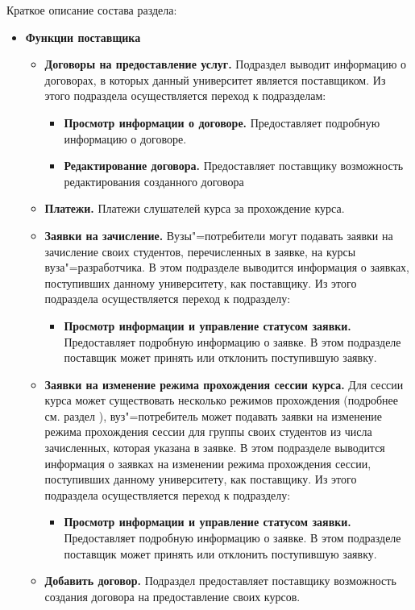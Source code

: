 Краткое описание состава раздела:
\begin{itemize}
	\item \textbf{Функции поставщика}
	\begin{itemize}
		\item \textbf{Договоры на предоставление услуг.} Подраздел выводит информацию о договорах, в которых данный университет является поставщиком. Из этого подраздела осуществляется переход к подразделам:
		\begin{itemize}
			\item \textbf{Просмотр информации о договоре.} Предоставляет подробную информацию о договоре.
			\item \textbf{Редактирование договора.} Предоставляет поставщику возможность редактирования созданного договора
		\end{itemize}
		\item \textbf{Платежи.} Платежи слушателей курса за прохождение курса.
		\item \textbf{Заявки на зачисление.} Вузы"=потребители могут подавать заявки на зачисление своих студентов, перечисленных в заявке, на курсы вуза"=разработчика. В этом подразделе выводится информация о заявках, поступивших данному университету, как поставщику.  Из этого подраздела осуществляется переход к подразделу:
		\begin{itemize}
			\item \textbf{Просмотр информации и управление статусом заявки.} Предоставляет подробную информацию о заявке. В этом подразделе поставщик может принять или отклонить поступившую заявку.
		\end{itemize}
		\item \textbf{Заявки на изменение режима прохождения сессии курса.} Для сессии курса может существовать несколько режимов прохождения (подробнее см. раздел ), вуз"=потребитель может подавать заявки на изменение режима прохождения сессии для группы своих студентов из числа зачисленных, которая указана в заявке. В этом подразделе выводится информация о заявках на изменении режима прохождения сессии, поступивших данному университету, как поставщику. Из этого подраздела осуществляется переход к подразделу:
		\begin{itemize}
			\item \textbf{Просмотр информации и управление статусом заявки.} Предоставляет подробную информацию о заявке. В этом подразделе поставщик может принять или отклонить поступившую заявку.
		\end{itemize}
		\item \textbf{Добавить договор.} Подраздел предоставляет поставщику возможность создания договора на предоставление своих курсов.
	\end{itemize}
	

\end{itemize}
